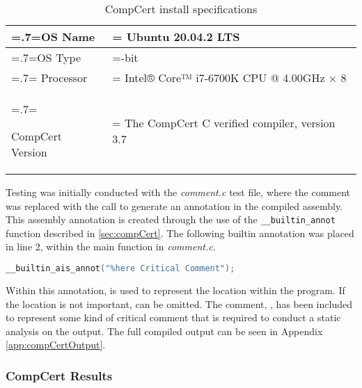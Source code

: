 \begin{table}
    \begin{center}
        \begin{tabularx}{\linewidth} { 
            | >{\hsize=.7\hsize\linewidth=\hsize}X 
            | >{\hsize=1.3\hsize\linewidth=\hsize}X  | }
            \hline
            OS Name & Ubuntu 20.04.2 LTS \\
            \hline
            OS Type & 64-bit \\
            \hline
            Processor & Intel® Core™ i7-6700K CPU @ 4.00GHz × 8 \\
            \hline
            \raggedright
            CompCert Version & The CompCert C verified compiler, version 3.7 \\
            \hline
        \end{tabularx}
    \end{center}
    \caption{CompCert install specifications}
    \label{tab:compcertInstall}
\end{table}

Testing was initially conducted with the \textit{comment.c} test file, where the comment was replaced with the call to generate an annotation in the compiled assembly. This assembly annotation is created through the use of the \texttt{\_\_builtin\_annot} function described in \ref{sec:compCert}. The following builtin annotation was placed in line 2, within the main function in \textit{comment.c}.

\begin{lstlisting}[language=C]
__builtin_ais_annot("%here Critical Comment");
\end{lstlisting}

Within this annotation,  is used to represent the location within the program. If the location is not important,  can be omitted. The comment, , has been included to represent some kind of critical comment that is required to conduct a static analysis on the output. The full compiled output can be seen in Appendix \ref{app:compCertOutput}.

\subsubsection{CompCert Results}

